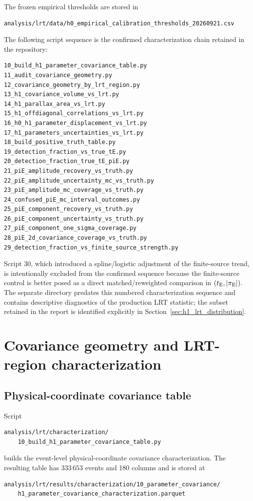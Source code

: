 \documentclass[11pt,a4paper]{article}
\newcommand{\te}{t_{\rm E}}
\begin{document}
The frozen empirical thresholds are stored in
\begin{verbatim}
analysis/lrt/data/h0_empirical_calibration_thresholds_20260921.csv
\end{verbatim}

The following script sequence is the confirmed characterization chain retained
in the repository:
\begin{verbatim}
10_build_h1_parameter_covariance_table.py
11_audit_covariance_geometry.py
12_covariance_geometry_by_lrt_region.py
13_h1_covariance_volume_vs_lrt.py
14_h1_parallax_area_vs_lrt.py
15_h1_offdiagonal_correlations_vs_lrt.py
16_h0_h1_parameter_displacement_vs_lrt.py
17_h1_parameters_uncertainties_vs_lrt.py
18_build_positive_truth_table.py
19_detection_fraction_vs_true_tE.py
20_detection_fraction_true_tE_piE.py
21_piE_amplitude_recovery_vs_truth.py
22_piE_amplitude_uncertainty_mc_vs_truth.py
23_piE_amplitude_mc_coverage_vs_truth.py
24_confused_piE_mc_interval_outcomes.py
25_piE_component_recovery_vs_truth.py
26_piE_component_uncertainty_vs_truth.py
27_piE_component_one_sigma_coverage.py
28_piE_2d_covariance_coverage_vs_truth.py
29_detection_fraction_vs_finite_source_strength.py
\end{verbatim}

Script 30, which introduced a spline/logistic adjustment of the finite-source
trend, is intentionally excluded from the confirmed sequence because the finite-source
control is better posed as a direct matched/reweighted comparison in $(\te,|\pi_{\rm E}|)$.
The separate directory  predates this numbered
characterization sequence and contains descriptive diagnostics of the production LRT
statistic; the subset retained in the report is identified explicitly in
Section~\ref{sec:h1_lrt_distribution}.

\section{Covariance geometry and LRT-region characterization}

\subsection{Physical-coordinate covariance table}

Script
\begin{verbatim}
analysis/lrt/characterization/
    10_build_h1_parameter_covariance_table.py
\end{verbatim}
builds the event-level physical-coordinate covariance characterization.  The
resulting table has $333\,653$ events and 180 columns and is stored at
\begin{verbatim}
analysis/lrt/results/characterization/10_parameter_covariance/
    h1_parameter_covariance_characterization.parquet
\end{verbatim}
\end{document}
